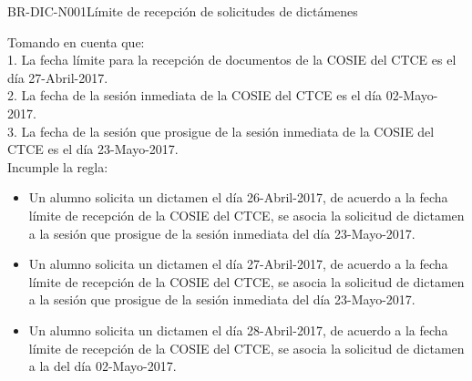 \begin{BusinessRule}{BR-DIC-N001}{Límite de recepción de solicitudes de dictámenes}
\begin{itemize}
	\end{itemize}
	Tomando en cuenta que:\\
			 1. La fecha límite para la recepción de documentos de la COSIE del CTCE es el día 27-Abril-2017.\\ 
			 2. La fecha de la sesión inmediata de la COSIE del CTCE es el día 02-Mayo-2017.\\
			 3. La fecha de la sesión que prosigue de la sesión inmediata de la COSIE del CTCE es el día 23-Mayo-2017.\\
	Incumple la regla:
	\begin{itemize}
		\item Un alumno solicita un dictamen el día 26-Abril-2017, de acuerdo a la fecha límite de recepción de la COSIE del CTCE, se asocia la solicitud de dictamen a la sesión que prosigue de la sesión inmediata del día 23-Mayo-2017.
		\item Un alumno solicita un dictamen el día 27-Abril-2017, de acuerdo a la fecha límite de recepción de la COSIE del CTCE, se asocia la solicitud de dictamen a la sesión que prosigue de la sesión inmediata del día 23-Mayo-2017.
		\item Un alumno solicita un dictamen el día 28-Abril-2017, de acuerdo a la fecha límite de recepción de la COSIE del CTCE, se asocia la solicitud de dictamen a la del día 02-Mayo-2017.
	\end{itemize}
	
\end{BusinessRule} 


